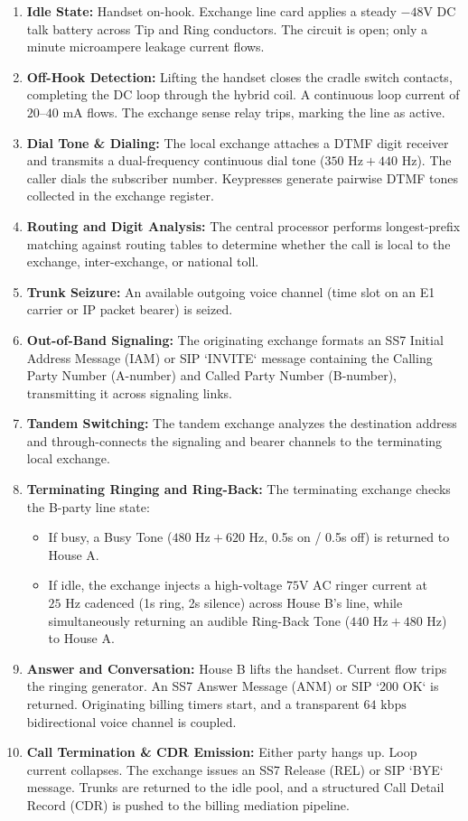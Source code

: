 \documentclass[12pt,a4paper]{report}
\begin{document}
\begin{enumerate}
    \item \textbf{Idle State:} Handset on-hook. Exchange line card applies a steady $-48\text{V DC}$ talk battery across Tip and Ring conductors. The circuit is open; only a minute microampere leakage current flows.
    \item \textbf{Off-Hook Detection:} Lifting the handset closes the cradle switch contacts, completing the DC loop through the hybrid coil. A continuous loop current of $20\text{--}40\text{ mA}$ flows. The exchange sense relay trips, marking the line as active.
    \item \textbf{Dial Tone \& Dialing:} The local exchange attaches a DTMF digit receiver and transmits a dual-frequency continuous dial tone ($350\text{ Hz} + 440\text{ Hz}$). The caller dials the subscriber number. Keypresses generate pairwise DTMF tones collected in the exchange register.
    \item \textbf{Routing and Digit Analysis:} The central processor performs longest-prefix matching against routing tables to determine whether the call is local to the exchange, inter-exchange, or national toll.
    \item \textbf{Trunk Seizure:} An available outgoing voice channel (time slot on an E1 carrier or IP packet bearer) is seized.
    \item \textbf{Out-of-Band Signaling:} The originating exchange formats an SS7 Initial Address Message (IAM) or SIP `INVITE` message containing the Calling Party Number (A-number) and Called Party Number (B-number), transmitting it across signaling links.
    \item \textbf{Tandem Switching:} The tandem exchange analyzes the destination address and through-connects the signaling and bearer channels to the terminating local exchange.
    \item \textbf{Terminating Ringing and Ring-Back:} The terminating exchange checks the B-party line state:
    \begin{itemize}
        \item If busy, a Busy Tone ($480\text{ Hz} + 620\text{ Hz}$, 0.5s on / 0.5s off) is returned to House A.
        \item If idle, the exchange injects a high-voltage $75\text{V AC}$ ringer current at $25\text{ Hz}$ cadenced (1s ring, 2s silence) across House B's line, while simultaneously returning an audible Ring-Back Tone ($440\text{ Hz} + 480\text{ Hz}$) to House A.
    \end{itemize}
    \item \textbf{Answer and Conversation:} House B lifts the handset. Current flow trips the ringing generator. An SS7 Answer Message (ANM) or SIP `200 OK` is returned. Originating billing timers start, and a transparent $64\text{ kbps}$ bidirectional voice channel is coupled.
    \item \textbf{Call Termination \& CDR Emission:} Either party hangs up. Loop current collapses. The exchange issues an SS7 Release (REL) or SIP `BYE` message. Trunks are returned to the idle pool, and a structured Call Detail Record (CDR) is pushed to the billing mediation pipeline.
\end{enumerate}
\end{document}

